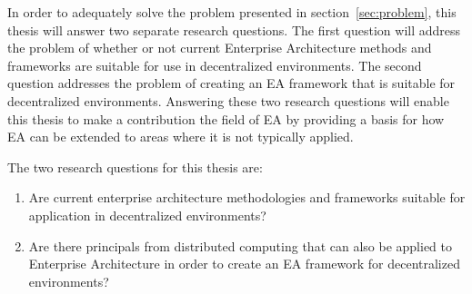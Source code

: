 In order to adequately solve the problem presented in section~\ref{sec:problem}, this thesis will answer two separate research questions. The first question will address the problem of whether or not current Enterprise Architecture methods and frameworks are suitable for use in decentralized environments. The second question addresses the problem of creating an EA framework that is suitable for decentralized environments. Answering these two research questions will enable this thesis to make a contribution the field of EA by providing a basis for how EA can be extended to areas where it is not typically applied. 

The two research questions for this thesis are:

\begin{enumerate}
\item Are current enterprise architecture methodologies and frameworks suitable for application in decentralized environments?
\label{req:1}
\item Are there principals from distributed computing that can also be applied to Enterprise Architecture in order to create an EA framework for decentralized environments?
\label{req:2}
\end{enumerate}

